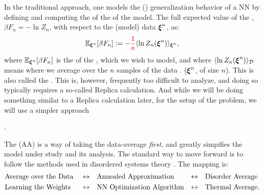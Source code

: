 In the traditional \SMOG approach, one models the (\Typical) generalization behavior of a NN
by defining and computing the \ExpectedValue of the \FreeEnergy of the model.
The full expected value  of the \FreeEnergy, $\beta F_{n}=-\ln Z_{n}$, with respect to the (model)
  data $\boldsymbol{\xi}^{n}$, as:
\begin{align}
  \mathbb{E}_{\boldsymbol{\xi}^{n}}[\beta F_n]:=-{\color{red}\sf{\frac{1}{n}}}\langle \ln Z_{n}(\boldsymbol{\xi}^{n})\rangle_{\boldsymbol{\xi}^{n}},
\end{align}
where $\mathbb{E}_{\boldsymbol{\xi}^{n}}[\beta F_n]$ is the \ExpectedValue of the \FreeEnergy, which we wish to model, and 
where $\langle \ln Z_{n}(\boldsymbol{\xi}^{n})\rangle_{\mathcal{D}}$ means where we average over  the $n$ samples of the data .
($\boldsymbol{\xi}^{n}$, of size $n$).  This is also called the \Quenched \FreeEnergy.
This is, however,  frequently too difficult to analyze, and doing so typically
requires a so-called Replica calculation. And while we will be doing something similar
to a Replica calculation later, for the setup of the problem, we will use a simpler approach

.

The \AnnealedApproximation (AA) is a way of taking the data-average \emph{first}, and greatly
simpifies the model under study and its analysis.  The standard way to move forward is to follow the methods used
in disordered systems theory \cite{SST92,EB01_BOOK}.
The mapping is:
\begin{align*}
  &\mbox{Average over the Data }&\leftrightarrow& \quad\mbox{Annealed Approximation}    &\leftrightarrow& \quad\mbox{Disorder Average} \\
  &\mbox{Learning the Weights }      &\leftrightarrow& \quad\mbox{NN Optimization Algorithm} &\leftrightarrow& \quad\mbox{Thermal Average}  .
\end{align*}


